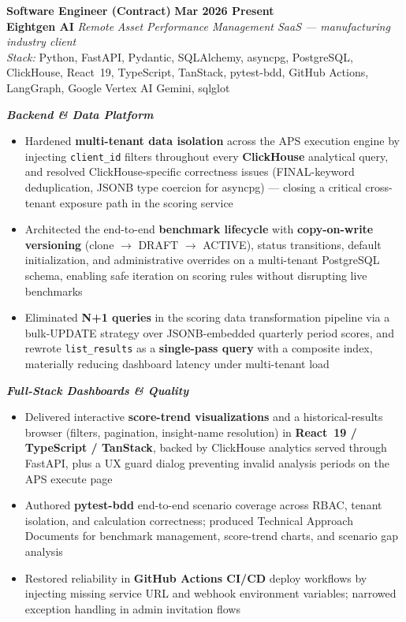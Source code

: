 \documentclass[a4paper,11.5pt]{article}
\newcommand{\h}[1]{\textbf{\textcolor{hgray}{#1}}}
\begin{document}
{\large\bfseries\textcolor{titlenavy}{Software Engineer (Contract)}} \hfill \textbf{Mar 2026 \textendash{} Present}\\
\textbf{Eightgen AI} \textbar{} \textit{Remote}
\hfill \textit{Asset Performance Management SaaS — manufacturing industry client}\\[0.2em]
\textit{Stack:} Python, FastAPI, Pydantic, SQLAlchemy, asyncpg, PostgreSQL, ClickHouse, React~19, TypeScript, TanStack, pytest-bdd, GitHub Actions, LangGraph, Google Vertex AI Gemini, sqlglot

\vspace{0.3em}
\textit{\textbf{\textcolor{titlenavy}{\small Backend \& Data Platform}}}
\begin{itemize}
  \item Hardened \h{multi-tenant data isolation} across the APS execution engine by injecting \texttt{client\_id} filters throughout every \h{ClickHouse} analytical query, and resolved ClickHouse-specific correctness issues (FINAL-keyword deduplication, JSONB type coercion for asyncpg) — closing a critical cross-tenant exposure path in the scoring service
  \item Architected the end-to-end \h{benchmark lifecycle} with \h{copy-on-write versioning} (clone $\rightarrow$ DRAFT $\rightarrow$ ACTIVE), status transitions, default initialization, and administrative overrides on a multi-tenant PostgreSQL schema, enabling safe iteration on scoring rules without disrupting live benchmarks
  \item Eliminated \h{N+1 queries} in the scoring data transformation pipeline via a bulk-UPDATE strategy over JSONB-embedded quarterly period scores, and rewrote \texttt{list\_results} as a \h{single-pass query} with a composite index, materially reducing dashboard latency under multi-tenant load
\end{itemize}

\vspace{0.25em}
\textit{\textbf{\textcolor{titlenavy}{\small Full-Stack Dashboards \& Quality}}}
\begin{itemize}
  \item Delivered interactive \h{score-trend visualizations} and a historical-results browser (filters, pagination, insight-name resolution) in \h{React~19 / TypeScript / TanStack}, backed by ClickHouse analytics served through FastAPI, plus a UX guard dialog preventing invalid analysis periods on the APS execute page
  \item Authored \h{pytest-bdd} end-to-end scenario coverage across RBAC, tenant isolation, and calculation correctness; produced Technical Approach Documents for benchmark management, score-trend charts, and scenario gap analysis
  \item Restored reliability in \h{GitHub Actions CI/CD} deploy workflows by injecting missing service URL and webhook environment variables; narrowed exception handling in admin invitation flows
\end{itemize}
\end{document}
